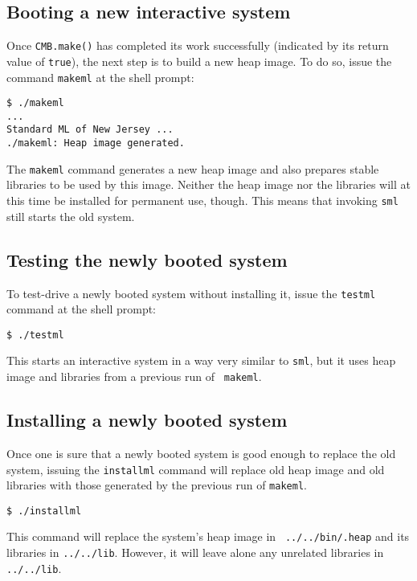 \subsection{Booting a new interactive system}

Once {\tt CMB.make()} has completed its work successfully (indicated
by its return value of {\tt true}), the next step is to build a new
heap image.  To do so, issue the command {\tt makeml} at the shell
prompt:

\begin{verbatim}
$ ./makeml
...
Standard ML of New Jersey ...
./makeml: Heap image generated.
\end{verbatim}

The {\tt makeml} command generates a new heap image and also prepares
stable libraries to be used by this image.  Neither the heap image nor
the libraries will at this time be installed for permanent use,
though.  This means that invoking {\tt sml} still starts the old
system.

\subsection{Testing the newly booted system}

To test-drive a newly booted system without installing it, issue the
{\tt testml} command at the shell prompt:

\begin{verbatim}
$ ./testml
\end{verbatim}

This starts an interactive system in a way very similar to {\tt sml},
but it uses heap image and libraries from a previous run of {\tt
makeml}.

\subsection{Installing a newly booted system}

Once one is sure that a newly booted system is good enough to replace
the old system, issuing the {\tt installml} command will replace old
heap image and old libraries with those generated by the previous run
of {\tt makeml}.

\begin{verbatim}
$ ./installml
\end{verbatim}

This command will replace the system's heap image in {\tt
../../bin/.heap} and its libraries in {\tt ../../lib}.  However, it
will leave alone any unrelated libraries in {\tt ../../lib}.

